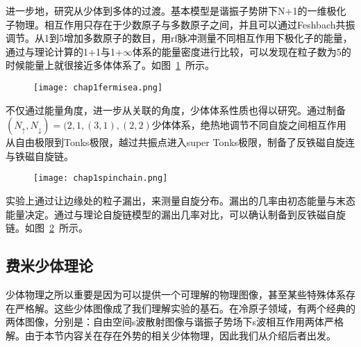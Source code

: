 进一步地，研究从少体到多体的过渡。基本模型是谐振子势阱下N+1的一维极化子物理。相互作用只存在于少数原子与多数原子之间，并且可以通过Feshbach共振调节。从1到5增加多数原子的数目，用rf脉冲测量不同相互作用下极化子的能量，通过与理论计算的1+1与1+$\infty$体系的能量密度进行比较，可以发现在粒子数为5的时候能量上就很接近多体体系了。如图~\ref{fermisea}~所示。
\begin{figure}[!htbp]
    \centering
    \texttt{[image: chap1fermisea.png]}
    \label{fermisea}
\end{figure}

不仅通过能量角度，进一步从关联的角度，少体体系性质也得以研究。通过制备$(N_\uparrow,N_\downarrow)=(2,1,(3,1),(2,2)$少体体系，绝热地调节不同自旋之间相互作用从自由极限到Tonks极限，越过共振点进入super Tonks极限，制备了反铁磁自旋连与铁磁自旋链。
\begin{figure}[!htbp]
    \centering
    \texttt{[image: chap1spinchain.png]}
    \label{chap1spinchainexp}
\end{figure}
实验上通过让边缘处的粒子漏出，来测量自旋分布。漏出的几率由初态能量与末态能量决定。通过与理论自旋链模型的漏出几率对比，可以确认制备到反铁磁自旋链。如图~\ref{chap1spinchainexp}~所示。


\subsection{费米少体理论}
少体物理之所以重要是因为可以提供一个可理解的物理图像，甚至某些特殊体系存在严格解。这些少体图像成了我们理解实验的基石。在冷原子领域，有两个经典的两体图像，分别是：自由空间s波散射图像与谐振子势场下s波相互作用两体严格解。由于本节内容关在存在外势的相关少体物理，因此我们从介绍后者出发。

